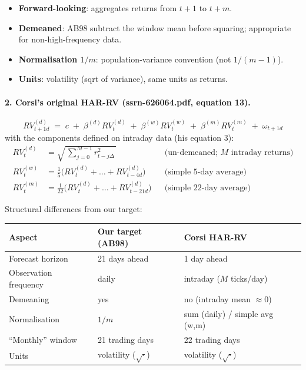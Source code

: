 \documentclass[11pt]{article}
\begin{document}
\begin{itemize}[leftmargin=*]
  \item \textbf{Forward-looking}: aggregates returns from $t{+}1$ to $t{+}m$.
  \item \textbf{Demeaned}: AB98 subtract the window mean before squaring; appropriate for non-high-frequency data.
  \item \textbf{Normalisation $1/m$}: population-variance convention (not $1/(m{-}1)$).
  \item \textbf{Units}: volatility (sqrt of variance), same units as returns.
\end{itemize}

\paragraph{2. Corsi's original HAR-RV (ssrn-626064.pdf, equation 13).}
\begin{equation}
RV^{(d)}_{t+1d} \;=\; c \;+\; \beta^{(d)} RV^{(d)}_{t} \;+\; \beta^{(w)} RV^{(w)}_{t} \;+\; \beta^{(m)} RV^{(m)}_{t} \;+\; \omega_{t+1d}
\end{equation}
with the components defined on intraday data (his equation 3):
\begin{align}
RV^{(d)}_{t} &= \sqrt{\,\sum_{j=0}^{M-1} r^{2}_{t-j\Delta}\,}            && \text{(un-demeaned; $M$ intraday returns)} \\
RV^{(w)}_{t} &= \tfrac{1}{5}\bigl(RV^{(d)}_{t} + \ldots + RV^{(d)}_{t-4d}\bigr)  && \text{(simple 5-day average)} \\
RV^{(m)}_{t} &= \tfrac{1}{22}\bigl(RV^{(d)}_{t} + \ldots + RV^{(d)}_{t-21d}\bigr) && \text{(simple 22-day average)}
\end{align}

Structural differences from our target:

\begin{center}
\renewcommand{\arraystretch}{1.15}
\begin{tabular}{@{}p{3.2cm} p{4.8cm} p{4.8cm}@{}}
\toprule
Aspect & Our target (AB98) & Corsi HAR-RV \\
\midrule
Forecast horizon           & 21 days ahead                                    & 1 day ahead \\
Observation frequency      & daily                                            & intraday ($M$ ticks/day) \\
Demeaning                  & yes                                              & no (intraday mean $\approx 0$) \\
Normalisation              & $1/m$                                            & sum (daily) / simple avg (w,m) \\
``Monthly'' window         & 21 trading days                                  & 22 trading days \\
Units                      & volatility ($\sqrt{\cdot}$)                     & volatility ($\sqrt{\cdot}$) \\
\bottomrule
\end{tabular}
\end{center}
\end{document}
